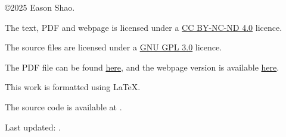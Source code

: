 \noindent \copyright 2025 Eason Shao.

\noindent The text, PDF and webpage is licensed under a \href{https://creativecommons.org/licenses/by-nc-nd/4.0/}{CC BY-NC-ND 4.0} licence.

\noindent The source files are licensed under a \href{https://www.gnu.org/licenses/gpl-3.0.en.html#license-text}{GNU GPL 3.0} licence.

\noindent The PDF file can be found \href{https://step.easonshao.com/latest.pdf}{here}, and the webpage version is available \href{https://step.easonshao.com/}{here}.

\noindent This work is formatted using \LaTeX.

\noindent The source code is available at .

\noindent Last updated: \Date.